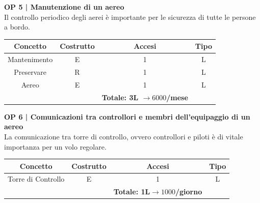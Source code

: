 \vspace{.6cm}


\textbf{\small OP 5 | Manutenzione di un aereo}\\

\textsf{\small Il controllo periodico degli aerei è importante per le sicurezza di tutte le persone a bordo.}\break

\begin{tabular}{ c c c c} 
	\hline
	\rowcolor{airforceblue}
	\textbf{\color{white}Concetto} & \textbf{\color{white}Costrutto} & \textbf{\color{white}Accesi} & \textbf{\color{white}Tipo}\\
	\hline
	\textsf{\small Mantenimento} & \textsf{\small E} & \textsf{\small 1} &  \textsf{\small L}\\
	\hline
	\textsf{\small Preservare} & \textsf{\small R} & \textsf{\small 1} &  \textsf{\small L}\\
	\hline
	\textsf{\small Aereo} & \textsf{\small E} & \textsf{\small 1} &  \textsf{\small L}\\
	\hline
	\rowcolor{airforceblue}
	\textsf{\small } & \textsf{\small } & \textbf{\color{white}Totale: 3L $\rightarrow 6000$/mese} \textsf{\small } & \textsf{\small }\\ %
	\hline
\end{tabular}

\vspace{.6cm}


\pagebreak

\textbf{\small OP 6 | Comunicazioni tra controllori e membri dell'equipaggio di un aereo}\\

\textsf{\small La comunicazione tra torre di controllo, ovvero controllori e piloti è di vitale importanza per un volo regolare.}\break

\begin{tabular}{ c c c c}
	\hline
	\rowcolor{airforceblue}
	\textbf{\color{white}Concetto} & \textbf{\color{white}Costrutto} & \textbf{\color{white}Accesi} & \textbf{\color{white}Tipo}\\
	\hline
	\textsf{\small Torre di Controllo} & \textsf{\small E} & \textsf{\small 1} &  \textsf{\small L}\\
	\hline
	\rowcolor{airforceblue}
	\textsf{\small } & \textsf{\small } & \textbf{\color{white}Totale: 1L$\rightarrow 1000$/giorno } \textsf{\small } & \textsf{\small }\\ 
	\hline
\end{tabular}

